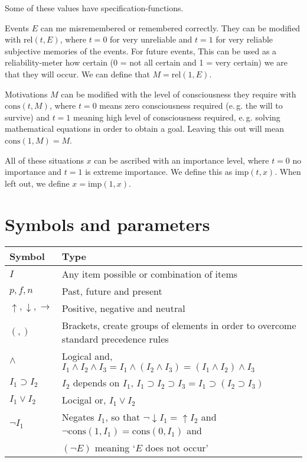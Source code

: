 \documentclass{scrartcl}
\begin{document}
Some of these values have specification-functions.

Events $E$ can me misremembered or remembered correctly. They can be modified with $\textrm{rel}(t, E)$, where $t = 0$ for very unreliable and
$t = 1$ for very reliable subjective memories of the events. For future events, This can be used as a reliability-meter how certain (0 = not all certain
and 1 = very certain) we are that they will occur. We can define that $M = \textrm{rel}(1, E)$.

Motivations $M$ can be modified with the level of consciousness they require with $\textrm{cons}(t, M)$, where $t = 0$ means zero consciousness required
(e.\,g. the will to survive) and $t = 1$ meaning high level of consciousness required, e.\,g. solving mathematical equations in order to obtain a goal.
Leaving this out will mean $\textrm{cons}(1, M) = M$.

All of these situations $x$ can be ascribed with an importance level, where $t = 0$ no importance and $t = 1$ is extreme importance. We define this as
$\textrm{imp}(t, x)$. When left out, we define $x = \textrm{imp}(1, x)$.

\section{Symbols and parameters}

\begin{tabular}{l|l}
	Symbol & Type \\ \hline
	$I$ & Any item possible or combination of items \\
	$p, f, n$ & Past, future and present \\
	$\uparrow, \downarrow, \rightarrow$ & Positive, negative and neutral \\
	$(, )$ & Brackets, create groups of elements in order to overcome standard precedence rules \\
	$\wedge$ & Logical and, $I_1 \wedge I_2 \wedge I_3 =  I_1 \wedge (I_2 \wedge I_3) = (I_1 \wedge I_2) \wedge I_3$\\
	$I_1 \supset I_2$ & $I_2$ depends on $I_1$, $I_1 \supset I_2 \supset I_3 = I_1 \supset (I_2 \supset I_3)$\\
	$I_1 \lor I_2$ & Locigal or, $I_1 \lor I_2$ \\
	$\lnot I_1$ & Negates $I_1$, so that $\lnot \downarrow I_1 = \uparrow I_2$ and $\lnot \textrm{cons}(1, I_1) = \textrm{cons}(0, I_1)$ and \\
		    & $(\lnot E)$ meaning `$E$ does not occur'\footnotemark
\end{tabular}
\end{document}
